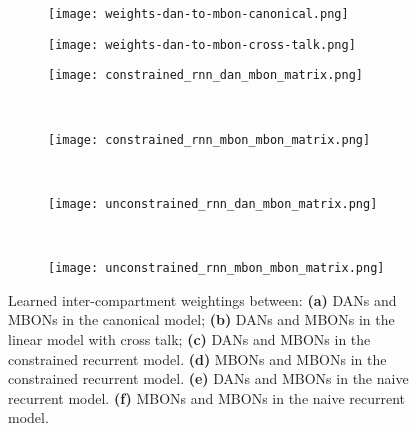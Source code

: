 \documentclass[11pt, A4]{article}
\begin{document}
\begin{multicols}{2}
\begin{figure*}
	\centering
	\begin{subfigure}[b]{0.46\textwidth}
		\centering
        		\caption{}
        		\texttt{[image: weights-dan-to-mbon-canonical.png]}
        		\label{fig:weights-dan-to-mbon-canonical}
     	\end{subfigure}
     		\vspace{-0.9em}
     	\begin{subfigure}[b]{0.46\textwidth}
         	\centering
         	\caption{}
         	\texttt{[image: weights-dan-to-mbon-cross-talk.png]}
         	\label{fig:weights-dan-to-mbon-cross-talk}
     	\end{subfigure}
	\vspace{-0.9em}
     	\begin{subfigure}[b]{0.46\textwidth}
         	\centering
         	\caption{}
         	\texttt{[image: constrained\_rnn\_dan\_mbon\_matrix.png]}
         	\label{fig:constrained_rnn_dan_mbon_matrix}
     	\end{subfigure}
	~
     	\begin{subfigure}[b]{0.46\textwidth}
         	\centering
         	\caption{}
         	\texttt{[image: constrained\_rnn\_mbon\_mbon\_matrix.png]}
         	\label{fig:constrained_rnn_mbon_mbon_matrix}
     	\end{subfigure}
	~
	\begin{subfigure}[b]{0.46\textwidth}
         	\centering
         	\caption{}
         	\texttt{[image: unconstrained\_rnn\_dan\_mbon\_matrix.png]}
         	\label{fig:unconstrained_rnn_dan_mbon_matrix}
     	\end{subfigure}
	~
     	\begin{subfigure}[b]{0.46\textwidth}
         	\centering
         	\caption{}
         	\texttt{[image: unconstrained\_rnn\_mbon\_mbon\_matrix.png]}
         	\label{fig:unconstrained_rnn_mbon_mbon_matrix}
     	\end{subfigure}
		\vspace{-0.9em}
	\caption{
	Learned inter-compartment weightings between:
	\textbf{(a)} DANs and MBONs in the canonical model;
	\textbf{(b)} DANs and MBONs in the linear model with cross talk;
	\textbf{(c)} DANs and MBONs in the constrained recurrent model.
	\textbf{(d)} MBONs and MBONs in the constrained recurrent model.
	\textbf{(e)} DANs and MBONs in the naive recurrent model.
	\textbf{(f)}  MBONs and MBONs in the naive recurrent model.	
	}
\end{figure*}




\end{multicols}
\end{document}
